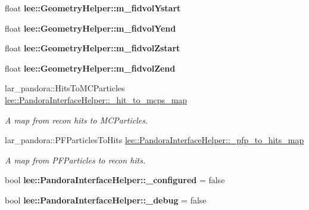 \begin{DoxyCompactItemize}
\item 
\hypertarget{group__lee_ga7a6451c1fc8cbf3d473820d3a63e2011}{float {\bfseries lee\-::\-Geometry\-Helper\-::m\-\_\-fidvol\-Ystart}}\label{group__lee_ga7a6451c1fc8cbf3d473820d3a63e2011}

\item 
\hypertarget{group__lee_ga264c826fdc8dff5cee93435d0e7391db}{float {\bfseries lee\-::\-Geometry\-Helper\-::m\-\_\-fidvol\-Yend}}\label{group__lee_ga264c826fdc8dff5cee93435d0e7391db}

\item 
\hypertarget{group__lee_gab0846ac674a2c392a95f7e3c36ee5981}{float {\bfseries lee\-::\-Geometry\-Helper\-::m\-\_\-fidvol\-Zstart}}\label{group__lee_gab0846ac674a2c392a95f7e3c36ee5981}

\item 
\hypertarget{group__lee_ga33ed7b1dc9f343d6f048ab67e69ab567}{float {\bfseries lee\-::\-Geometry\-Helper\-::m\-\_\-fidvol\-Zend}}\label{group__lee_ga33ed7b1dc9f343d6f048ab67e69ab567}

\item 
\hypertarget{group__lee_gadd430a976fa40632e14eb1688cdd785b}{lar\-\_\-pandora\-::\-Hits\-To\-M\-C\-Particles \hyperlink{group__lee_gadd430a976fa40632e14eb1688cdd785b}{lee\-::\-Pandora\-Interface\-Helper\-::\-\_\-hit\-\_\-to\-\_\-mcps\-\_\-map}}\label{group__lee_gadd430a976fa40632e14eb1688cdd785b}

\begin{DoxyCompactList}\small\item\em A map from recon hits to M\-C\-Particles. \end{DoxyCompactList}\item 
\hypertarget{group__lee_gae19df94cb2c29dc2735bf7436c5ccf63}{lar\-\_\-pandora\-::\-P\-F\-Particles\-To\-Hits \hyperlink{group__lee_gae19df94cb2c29dc2735bf7436c5ccf63}{lee\-::\-Pandora\-Interface\-Helper\-::\-\_\-pfp\-\_\-to\-\_\-hits\-\_\-map}}\label{group__lee_gae19df94cb2c29dc2735bf7436c5ccf63}

\begin{DoxyCompactList}\small\item\em A map from P\-F\-Particles to recon hits. \end{DoxyCompactList}\item 
\hypertarget{group__lee_ga2adc9100d7afd42201e3b158c537231c}{bool {\bfseries lee\-::\-Pandora\-Interface\-Helper\-::\-\_\-configured} = false}\label{group__lee_ga2adc9100d7afd42201e3b158c537231c}

\item 
\hypertarget{group__lee_gab8e095d1281cac84da211ba143991440}{bool {\bfseries lee\-::\-Pandora\-Interface\-Helper\-::\-\_\-debug} = false}\label{group__lee_gab8e095d1281cac84da211ba143991440}


\end{DoxyCompactItemize}
